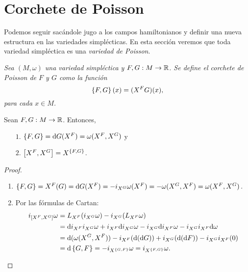 \section{Corchete de Poisson}\label{sec:poisson}
Podemos seguir sacándole jugo a los campos hamiltonianos y definir una nueva estructura en las variedades simplécticas. En esta sección veremos que toda variedad simpléctica es una \emph{variedad de Poisson}.

\begin{defn}
  \em
  Sea $(M,\omega)$ una variedad simpléctica y $F,G: M \rightarrow \mathbb{R}$. Se define el \emph{corchete de Poisson de $F$ y $G$} como la función
\begin{equation*}
  \left\lbrace F,G\right\rbrace(x) = (X^F G)(x),
\end{equation*}
para cada $x \in M$.
\end{defn}
\begin{prop}\leavevmode
  Sean $F,G:M\rightarrow \mathbb{R}$. Entonces,
  \begin{enumerate}
    \item[$1$.] $\left\lbrace F,G\right\rbrace = \mathrm{d} G (X^F)= \omega(X^F, X^G)$ y
    \item[$2$.] $\left[X^F,X^G\right] = X^{\left\lbrace F,G\right\rbrace}$.
  \end{enumerate}
\end{prop}
\begin{proof}\leavevmode
  \begin{enumerate}
    \item $\left\lbrace F,G\right\rbrace=X^F(G)=\mathrm{d} G(X^F) = -i_{X^G}\omega(X^F)=-\omega(X^G,X^F)=\omega(X^F,X^G)$.
    \item Por las fórmulas de Cartan:
      \begin{align*}
	i_{\left[X^F,X^G\right]} \omega & =  L_{X^F}(i_{X^G}\omega) - i_{X^G}(L_{X^F} \omega) \\ 
	& = \mathrm{d} i_{X^F}i_{X^G}\omega + i_{X^F}\mathrm{d} i_{X^G}\omega - i_{X^G}\mathrm{d} i_{X^F}\omega - i_{X^G}i_{X^F}\mathrm{d} \omega \\
	& = \mathrm{d} (\omega(X^G,X^F)) - i_{X^F}(\mathrm{d}(\mathrm{d} G)) + i_{X^G}(\mathrm{d} (\mathrm{d} F)) - i_{X^G}i_{X^F}(0) \\
	& = \mathrm{d} \left\lbrace G,F\right\rbrace = -i_{X^{\left\lbrace G,F\right\rbrace}}\omega=i_{X^{\left\lbrace F,G\right\rbrace}}\omega.
      \end{align*}
  \end{enumerate}
\end{proof}

